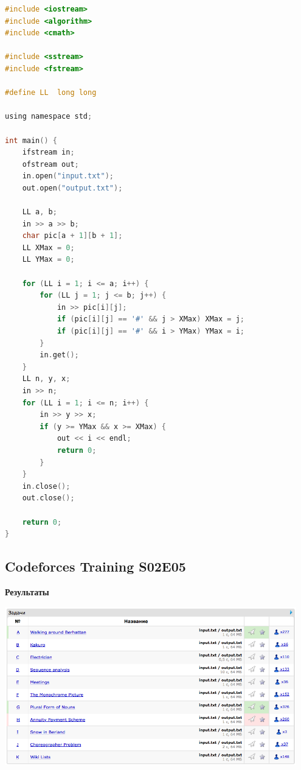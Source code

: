 \documentclass[a4paper,12pt]{article}
\begin{document}
\begin{lstlisting}[language=C]
#include <iostream>
#include <algorithm>
#include <cmath>

#include <sstream>
#include <fstream>

#define LL  long long

using namespace std;

int main() {
    ifstream in;
    ofstream out;
    in.open("input.txt");
    out.open("output.txt");
    
    LL a, b;
    in >> a >> b;
    char pic[a + 1][b + 1];
    LL XMax = 0;
    LL YMax = 0;
    
    for (LL i = 1; i <= a; i++) {
        for (LL j = 1; j <= b; j++) {
            in >> pic[i][j];
            if (pic[i][j] == '#' && j > XMax) XMax = j;
            if (pic[i][j] == '#' && i > YMax) YMax = i;
        }
        in.get();
    }
    LL n, y, x;
    in >> n;
    for (LL i = 1; i <= n; i++) {
        in >> y >> x;
        if (y >= YMax && x >= XMax) {
            out << i << endl;
            return 0;
        }
    }
    in.close();
    out.close();
    
    return 0;
}
\end{lstlisting}



%
%
\newpage
\subsection{Codeforces Training S02E05}

\textbf{{\large Результаты}} \\
\begin{center}
\includegraphics[width=0.95\textwidth]{CT_S02E05/CT_S02E05_result.png}\\ [1cm]
\end{center}
\end{document}
